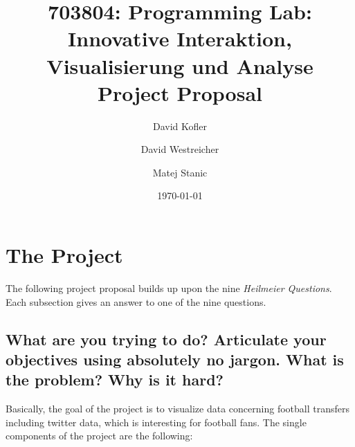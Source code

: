 \documentclass{article}
\begin{document}
\title{703804: Programming Lab: Innovative Interaktion,
Visualisierung und Analyse\\ Project Proposal}
\author{David Kofler \and David Westreicher \and Matej Stanic}
\date{\today}
\maketitle

\section{The Project}
The following project proposal builds up upon the nine \emph{Heilmeier Questions}. Each subsection gives an answer to one of the nine questions.

\subsection{What are you trying to do? Articulate your objectives using absolutely no jargon. What is the problem? Why is it hard?}
Basically, the goal of the project is to visualize data concerning football transfers including twitter data, which is interesting for football fans. The single components of the project are the following:
\end{document}

